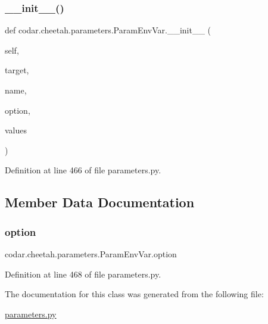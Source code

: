 \subsubsection{\texorpdfstring{\+\_\+\+\_\+init\+\_\+\+\_\+()}{\_\_init\_\_()}}
{\footnotesize\ttfamily def codar.\+cheetah.\+parameters.\+Param\+Env\+Var.\+\_\+\+\_\+init\+\_\+\+\_\+ (\begin{DoxyParamCaption}\item[{}]{self,  }\item[{}]{target,  }\item[{}]{name,  }\item[{}]{option,  }\item[{}]{values }\end{DoxyParamCaption})}



Definition at line 466 of file parameters.\+py.



\subsection{Member Data Documentation}
\mbox{\label{classcodar_1_1cheetah_1_1parameters_1_1_param_env_var_acb91e037a8f36b24a8588b808ad70444}} 
\subsubsection{\texorpdfstring{option}{option}}
{\footnotesize\ttfamily codar.\+cheetah.\+parameters.\+Param\+Env\+Var.\+option}



Definition at line 468 of file parameters.\+py.



The documentation for this class was generated from the following file\+:\begin{DoxyCompactItemize}
\item 
\hyperlink{parameters_8py}{parameters.\+py}\end{DoxyCompactItemize}

